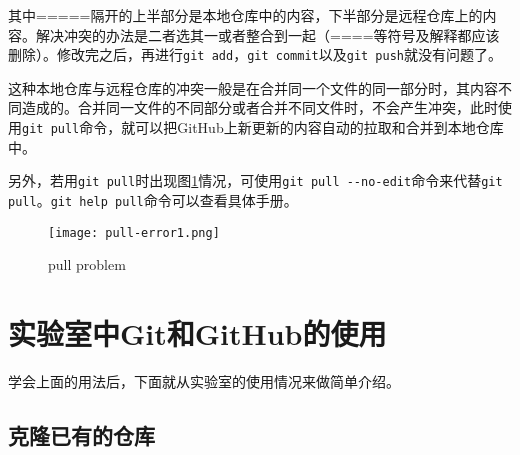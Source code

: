 \documentclass[a4paper,12pt]{article}
\begin{document}
其中=====隔开的上半部分是本地仓库中的内容，下半部分是远程仓库上的内容。解决冲突的办法是二者选其一或者整合到一起（====等符号及解释都应该删除）。修改完之后，再进行\lstinline|git add|，\lstinline|git commit|以及\lstinline|git push|就没有问题了。

这种本地仓库与远程仓库的冲突一般是在合并同一个文件的同一部分时，其内容不同造成的。合并同一文件的不同部分或者合并不同文件时，不会产生冲突，此时使用\lstinline|git pull|命令，就可以把GitHub上新更新的内容自动的拉取和合并到本地仓库中。

另外，若用\lstinline|git pull|时出现图\ref{fig:9}情况，可使用\lstinline|git pull --no-edit|命令来代替\lstinline|git pull|。\lstinline|git help pull|命令可以查看具体手册。

\begin{figure}[!htb] %
\centering
\texttt{[image: pull-error1.png]}
\caption{pull problem}\label{fig:9}
\end{figure}
\section{实验室中Git和GitHub的使用}

学会上面的用法后，下面就从实验室的使用情况来做简单介绍。

\subsection{克隆已有的仓库}
\end{document}
